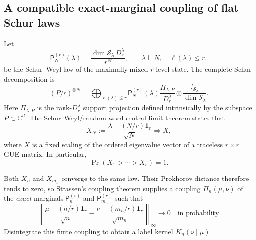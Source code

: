 \documentclass[11pt]{article}
\theoremstyle{remark}
\theoremstyle{plain}
\newcommand{\C}{\mathbb C}
\newcommand{\cS}{\mathcal S}
\newcommand{\ot}{\otimes}
\begin{document}
\subsection{A compatible exact-marginal coupling of flat Schur laws}

Let
\begin{equation}
  \mathsf P_N^{(r)}(\lambda)
  =\frac{\dim\cS_\lambda\,D_r^\lambda}{r^N},
  \qquad \lambda\vdash N,\quad\ell(\lambda)\le r,
  \label{eq:flat-schur-law}
\end{equation}
be the Schur--Weyl law of the maximally mixed \(r\)-level state.  The
complete Schur decomposition is
\begin{equation}
  (P/r)^{\ot N}
  =\bigoplus_{\ell(\lambda)\le r}
   \mathsf P_N^{(r)}(\lambda)
   \frac{\Pi_{\lambda,P}}{D_r^\lambda}
   \ot\frac{I_{\cS_\lambda}}{\dim\cS_\lambda}.
  \label{eq:flat-schur-decomposition}
\end{equation}
Here \(\Pi_{\lambda,P}\) is the rank-\(D_r^\lambda\) support projection
defined intrinsically by the subspace \(P\subset\C^d\).
The
Schur--Weyl/random-word central limit theorem
\cite{Kuperberg2002,Johansson2001} states that
\begin{equation}
  X_N:=\frac{\lambda-(N/r)\mathbf1_r}{\sqrt N}
  \Longrightarrow X,
  \label{eq:traceless-GUE-limit}
\end{equation}
where \(X\) is a fixed scaling of the ordered eigenvalue vector of a
traceless \(r\times r\) GUE matrix.  In particular,
\[
  \Pr(X_1>\cdots>X_r)=1.
\]

Both \(X_n\) and \(X_{m_n}\) converge to the same law.  Their Prokhorov
distance therefore tends to zero, so Strassen's coupling theorem supplies a
coupling \(\Pi_n(\mu,\nu)\) of the \emph{exact} marginals
\(\mathsf P_n^{(r)}\) and \(\mathsf P_{m_n}^{(r)}\) such that
\begin{equation}
  \left\|
    \frac{\mu-(n/r)\mathbf1_r}{\sqrt n}
    -\frac{\nu-(m_n/r)\mathbf1_r}{\sqrt{m_n}}
  \right\|_\infty
  \longrightarrow0
  \quad\text{in probability}.
  \label{eq:shape-coupling}
\end{equation}
Disintegrate this finite coupling to obtain a label kernel
\(K_n(\nu\mid\mu)\).
\end{document}
